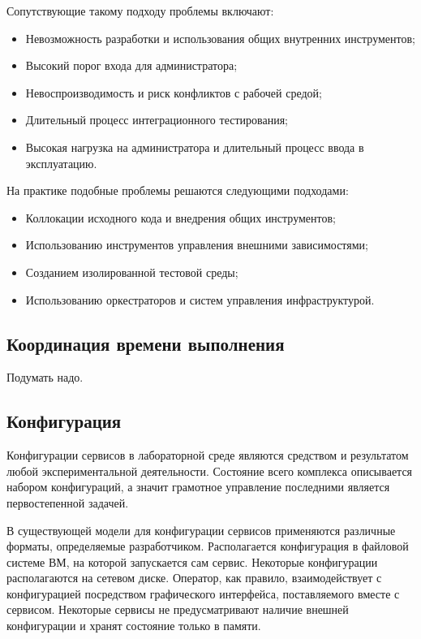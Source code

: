 \documentclass[../thesis.tex]{subfiles}
\begin{document}
	Сопутствующие такому подходу проблемы включают:

	\begin{itemize}
		\item Невозможность разработки и использования общих внутренних инструментов;

		\item Высокий порог входа для администратора;

		\item Невоспроизводимость и риск конфликтов с рабочей средой;

		\item Длительный процесс интеграционного тестирования;

		\item Высокая нагрузка на администратора и длительный процесс ввода в эксплуатацию.
	\end{itemize}

	На практике подобные проблемы решаются следующими подходами:

	\begin{itemize}
		\item Коллокации исходного кода и внедрения общих инструментов;

		\item Использованию инструментов управления внешними зависимостями;

		\item Созданием изолированной тестовой среды;

		\item Использованию оркестраторов и систем управления инфраструктурой.
	\end{itemize}

	\subsection{Координация времени выполнения}

	Подумать надо.

	\subsection{Конфигурация}

	Конфигурации сервисов в лабораторной среде являются средством и результатом любой
	экспериментальной деятельности. Состояние всего комплекса описывается набором конфигураций, а
	значит грамотное управление последними является первостепенной задачей.

	В существующей модели для конфигурации сервисов применяются различные форматы, определяемые разработчиком.
	Располагается конфигурация в файловой системе ВМ, на которой запускается сам сервис. Некоторые
	конфигурации располагаются на сетевом диске. Оператор, как правило, взаимодействует с конфигурацией
	посредством графического интерфейса, поставляемого вместе с сервисом. Некоторые сервисы не предусматривают
	наличие внешней конфигурации и хранят состояние только в памяти.
\end{document}
